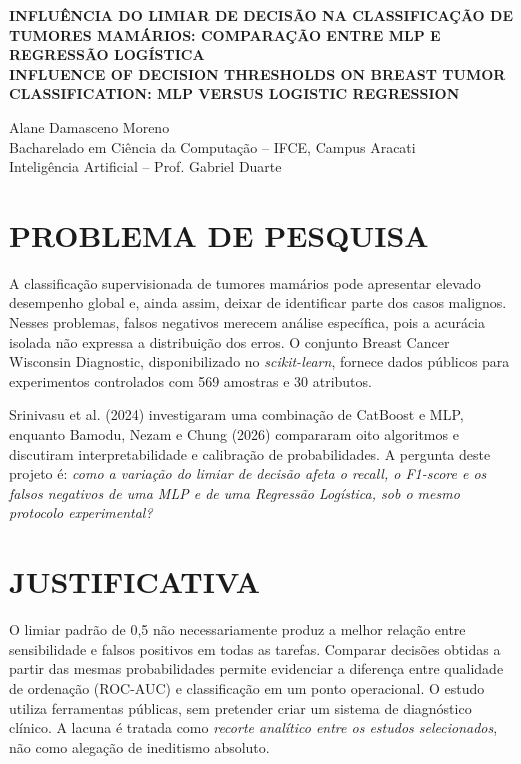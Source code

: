 \documentclass[article,11pt,oneside,a4paper,english,brazil,sumario=tradicional]{abntex2}
\begin{document}
\frenchspacing
\thispagestyle{empty}
\begin{center}
\uppercase{\bfseries Influência do limiar de decisão na classificação de tumores mamários: comparação entre MLP e Regressão Logística}\\[8pt]
\uppercase{\bfseries Influence of decision thresholds on breast tumor classification: MLP versus Logistic Regression}
\end{center}
\begin{flushright}
Alane Damasceno Moreno\\
{\small Bacharelado em Ciência da Computação -- IFCE, Campus Aracati}\\
{\small Inteligência Artificial -- Prof. Gabriel Duarte}
\end{flushright}
\vspace{-0.2em}
\section{PROBLEMA DE PESQUISA}

A classificação supervisionada de tumores mamários pode apresentar elevado desempenho global e, ainda assim, deixar de identificar parte dos casos malignos. Nesses problemas, falsos negativos merecem análise específica, pois a acurácia isolada não expressa a distribuição dos erros. O conjunto Breast Cancer Wisconsin Diagnostic, disponibilizado no \textit{scikit-learn}, fornece dados públicos para experimentos controlados com 569 amostras e 30 atributos.

Srinivasu et al. (2024) investigaram uma combinação de CatBoost e MLP, enquanto Bamodu, Nezam e Chung (2026) compararam oito algoritmos e discutiram interpretabilidade e calibração de probabilidades. A pergunta deste projeto é: \textit{como a variação do limiar de decisão afeta o recall, o F1-score e os falsos negativos de uma MLP e de uma Regressão Logística, sob o mesmo protocolo experimental?}

\section{JUSTIFICATIVA}
O limiar padrão de 0,5 não necessariamente produz a melhor relação entre sensibilidade e falsos positivos em todas as tarefas. Comparar decisões obtidas a partir das mesmas probabilidades permite evidenciar a diferença entre qualidade de ordenação (ROC-AUC) e classificação em um ponto operacional. O estudo utiliza ferramentas públicas, sem pretender criar um sistema de diagnóstico clínico. A lacuna é tratada como \textit{recorte analítico entre os estudos selecionados}, não como alegação de ineditismo absoluto.
\end{document}
